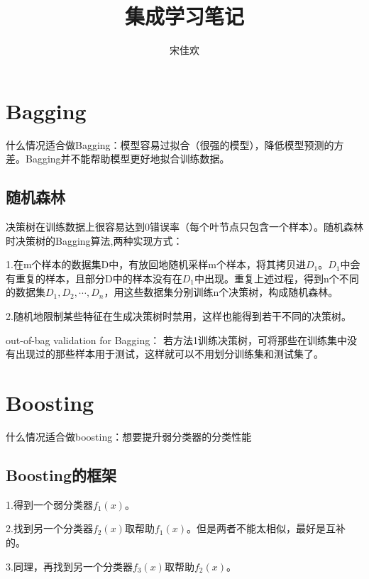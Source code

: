 \documentclass[UTF8]{ctexart} %
\title{集成学习笔记}
\author{宋佳欢}
\begin{document}
	\maketitle
	\tableofcontents
	\songti {}
	
	\section{Bagging}
		什么情况适合做Bagging：模型容易过拟合（很强的模型），降低模型预测的方差。Bagging并不能帮助模型更好地拟合训练数据。
		\subsection{随机森林}
		决策树在训练数据上很容易达到0错误率（每个叶节点只包含一个样本）。随机森林时决策树的Bagging算法,两种实现方式：
		
		1.在m个样本的数据集D中，有放回地随机采样m个样本，将其拷贝进$D_1$。$D_1$中会有重复的样本，且部分D中的样本没有在$D_1$中出现。重复上述过程，得到n个不同的数据集${D_1,D_2,\cdots,D_n}$，用这些数据集分别训练n个决策树，构成随机森林。
		
		2.随机地限制某些特征在生成决策树时禁用，这样也能得到若干不同的决策树。
		
		out-of-bag validation for Bagging：
		若方法1训练决策树，可将那些在训练集中没有出现过的那些样本用于测试，这样就可以不用划分训练集和测试集了。
	\section{Boosting}
		什么情况适合做boosting：想要提升弱分类器的分类性能
		\begin{figure}[H]
		\end{figure}
		\subsection{Boosting的框架}
		
			1.得到一个弱分类器$f_1(x)$。
			
			2.找到另一个分类器$f_2(x)$取帮助$f_1(x)$。但是两者不能太相似，最好是互补的。
				
			3.同理，再找到另一个分类器$f_3(x)$取帮助$f_2(x)$。
			
\end{document}

